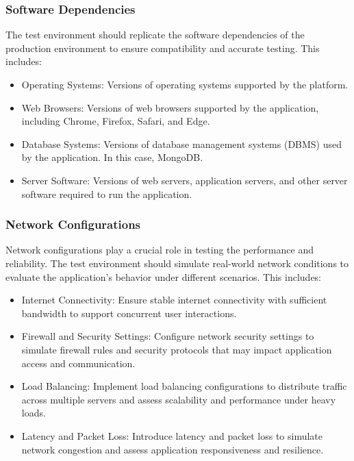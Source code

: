 		\subsubsection{Software Dependencies}
		
		The test environment should replicate the software dependencies of the production environment to ensure compatibility and accurate testing. This includes:
		
		\begin{itemize}
			\item Operating Systems: Versions of operating systems supported by the platform.
			\item Web Browsers: Versions of web browsers supported by the application, including Chrome, Firefox, Safari, and Edge.
			\item Database Systems: Versions of database management systems (DBMS) used by the application. In this case, MongoDB.
			\item Server Software: Versions of web servers, application servers, and other server software required to run the application.
		\end{itemize}
		
		\subsubsection{Network Configurations}
		
		Network configurations play a crucial role in testing the performance and reliability. The test environment should simulate real-world network conditions to evaluate the application's behavior under different scenarios. This includes:
		
		\begin{itemize}
			\item Internet Connectivity: Ensure stable internet connectivity with sufficient bandwidth to support concurrent user interactions.
			\item Firewall and Security Settings: Configure network security settings to simulate firewall rules and security protocols that may impact application access and communication.
			\item Load Balancing: Implement load balancing configurations to distribute traffic across multiple servers and assess scalability and performance under heavy loads.
			\item Latency and Packet Loss: Introduce latency and packet loss to simulate network congestion and assess application responsiveness and resilience.
		\end{itemize}
		
